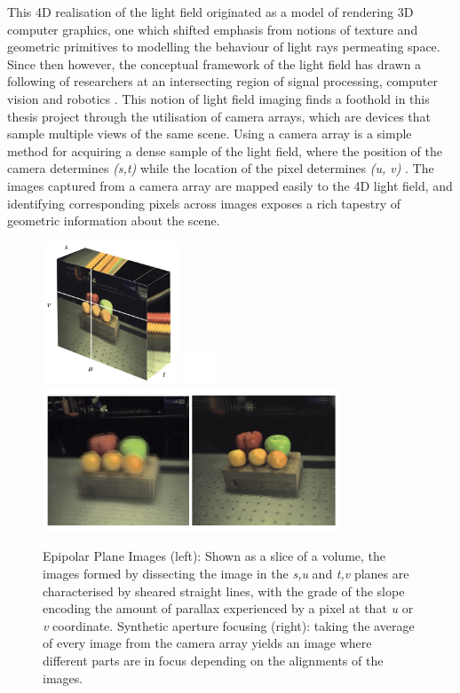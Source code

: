 \documentclass[openany]{book}
\begin{document}
This 4D realisation of the light field originated as a model of rendering 3D computer graphics, one which shifted emphasis from notions of texture and geometric primitives to modelling the behaviour of light rays permeating space. Since then however, the conceptual framework of the light field has drawn a following of researchers at an intersecting region of signal processing, computer vision and robotics \cite{dansereau2014phd}. This notion of light field imaging finds a foothold in this thesis project through the utilisation of camera arrays, which are devices that sample multiple views of the same scene. Using a camera array is a simple method for acquiring a dense sample of the light field, where the position of the camera determines \textit{(s,t)} while the location of the pixel determines \textit{(u, v)} \cite{yao2016camarray}. The images captured from a camera array are mapped easily to the 4D light field, and identifying corresponding pixels across images exposes a rich tapestry of geometric information about the scene. 

\begin{figure}[htbp]
    \centering
    \includegraphics[width=1.6in]{images/epipolarimage.png}
    \includegraphics[width=0.4in]{images/blank.png}
    \includegraphics[width=3.5in]{images/fruitfocus.png}
    \caption{Epipolar Plane Images (left): Shown as a slice of a volume, the images formed by dissecting the image in the \textit{s,u} and \textit{t,v} planes are characterised by sheared straight lines, with the grade of the slope encoding the amount of parallax experienced by a pixel at that \textit{u} or \textit{v} coordinate. Synthetic aperture focusing (right): taking the average of every image from the camera array yields an image where different parts are in focus depending on the alignments of the images.}
    \label{epiplaneimg}
\end{figure}
\end{document}
